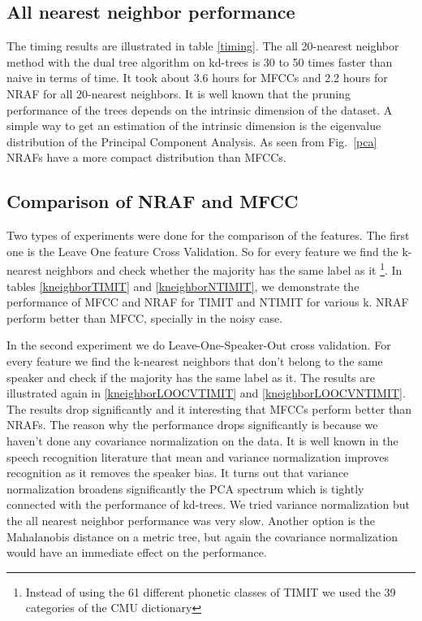 \documentclass[12pt,letterpaper,doublespaced,ETD,dvips,proposal]{gtthesis}
\begin{document}
\begin{Body}
\subsection{All nearest neighbor performance}
The timing results are illustrated in table \ref{timing}. The all
20-nearest neighbor method with the dual tree algorithm on kd-trees
is 30 to 50 times faster than naive in terms of time. It took about
3.6 hours for MFCCs and 2.2 hours for NRAF for all 20-nearest
neighbors. It is well known that the pruning performance of the
trees depends on the intrinsic dimension of the dataset. A simple
way to get an estimation of the intrinsic dimension is the
eigenvalue distribution of the Principal Component Analysis. As seen
from Fig.~\ref{pca} NRAFs have a more compact distribution than
MFCCs.
\subsection{Comparison of NRAF and MFCC}
Two types of experiments were done for the comparison of the
features. The first one is the Leave One feature Cross Validation.
So for every feature we find the k-nearest neighbors and check
whether the majority has the same label as it \footnote{Instead of
using the 61 different phonetic classes of TIMIT we used the 39
categories of the CMU dictionary}. In tables \ref{kneighborTIMIT}
and \ref{kneighborNTIMIT}, we demonstrate the performance of MFCC
and NRAF for TIMIT and NTIMIT for various k. NRAF perform better
than MFCC, specially in the noisy case.

In the second experiment we do Leave-One-Speaker-Out cross
validation. For every feature we find the k-nearest neighbors that
don't belong to the same speaker and check if the majority has the
same label as it. The results are illustrated again in
\ref{kneighborLOOCVTIMIT} and \ref{kneighborLOOCVNTIMIT}. The
results drop significantly and it interesting that MFCCs perform
better than NRAFs. The reason why the performance drops
significantly is because we haven't done any covariance
normalization on the data. It is well known in the speech
recognition literature that mean and variance normalization improves
recognition as it removes the speaker bias. It turns out that
variance normalization broadens significantly the PCA spectrum which
is tightly connected with the performance of kd-trees. We tried
variance normalization but the all nearest neighbor performance was
very slow. Another option is the Mahalanobis distance on a metric
tree, but again the covariance normalization would have an immediate
effect on the performance.


\end{Body}
\end{document}
